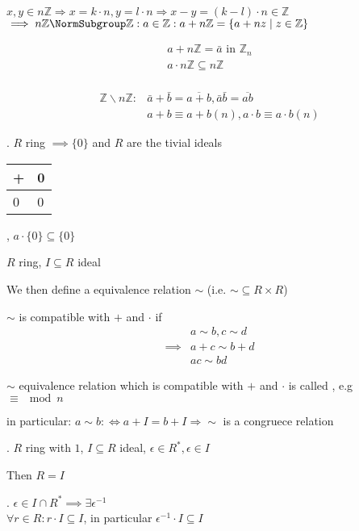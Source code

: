 $x,y \in n\mathbb{Z} \Rightarrow x = k\cdot n, y = l\cdot n \Rightarrow x -y = (k-l) \cdot n \in \mathbb{Z}$\\
$\implies n\mathbb{Z} \NormSubgroup \mathbb{Z}: a \in \mathbb{Z} : a+n\mathbb{Z} = \{a+nz \mid z\in \mathbb{Z} \}$

\begin{align*}
  a+n\mathbb{Z} = \bar{a} \text{ in } \mathbb{Z}_n \\
  a \cdot n \mathbb{Z} \subseteq n \mathbb{Z} \\
\end{align*}

\begin{align*}
  \mathbb{Z} \backslash n \mathbb{Z}: 
    & \bar{a} + \bar{b} = \overline{a+b}, \bar{a} \bar{b} = \overline{ab} \\
    & a+b \equiv a+b (n), a\cdot b \equiv a\cdot b (n)
\end{align*}

\Remark.
$R$ ring $\implies \{0\}$ and $R$ are the tivial ideals

\begin{tabular}{l|l}
+ & 0 \\
\hline
0 & 0
\end{tabular}
, $a \cdot \{0\} \subseteq \{0\}$

\begin{definition}
  $R$ ring, $I \subseteq R$ ideal

  We then define a equivalence relation $\sim$ (i.e. $\sim \subseteq R \times R$)

  $\sim$ is compatible with $+$ and $\cdot$ if 
  \begin{align*}
    & a \sim b, c \sim d \\
    \implies & a +c \sim b+d \\
             & ac \sim bd
  \end{align*}

  $\sim$ equivalence relation which is compatible with $+$ and $\cdot$
  is called , e.g $\equiv \mod n$

  in particular: $a\sim b :\Leftrightarrow a + I = b + I \Rightarrow \sim$ is a congruece relation
\end{definition}

\Theorem.
$R$ ring with $1$, $I \subseteq R$ ideal, $ \epsilon \in R^{*}, \epsilon \in I$

Then $R = I$

\Proof. 
$\epsilon \in I \cap R^{*} \implies \exists \epsilon^{-1}$ \\
$\forall r \in R: r \cdot I \subseteq I$, in particular $\epsilon^{-1} \cdot I \subseteq I$

